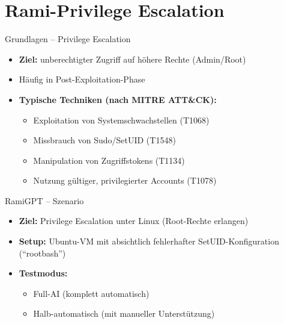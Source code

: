 \documentclass[
	aspectratio=169,	%
	onlytextwidth,		%
	t,					%
	]{beamer}
\begin{document}

\section{Rami-Privilege Escalation}
\begin{frame}{Grundlagen – Privilege Escalation}
	\begin{itemize}
		\item \textbf{Ziel:} unberechtigter Zugriff auf höhere Rechte (Admin/Root)
		\item Häufig in Post-Exploitation-Phase
		\item \textbf{Typische Techniken (nach MITRE ATT\&CK):}
		\begin{itemize}
			\item Exploitation von Systemschwachstellen (T1068)
			\item Missbrauch von Sudo/SetUID (T1548)
			\item Manipulation von Zugriffstokens (T1134)
			\item Nutzung gültiger, privilegierter Accounts (T1078)
		\end{itemize}
	\end{itemize}
\end{frame}

\begin{frame}{RamiGPT – Szenario}
	\begin{itemize}
		\item \textbf{Ziel:} Privilege Escalation unter Linux (Root-Rechte erlangen)
		\item \textbf{Setup:} Ubuntu-VM mit absichtlich fehlerhafter SetUID-Konfiguration (\enquote{rootbash})
		\item \textbf{Testmodus:}
		\begin{itemize}
			\item Full-AI (komplett automatisch)
			\item Halb-automatisch (mit manueller Unterstützung)
		\end{itemize}
	\end{itemize}
\end{frame}
\end{document}
